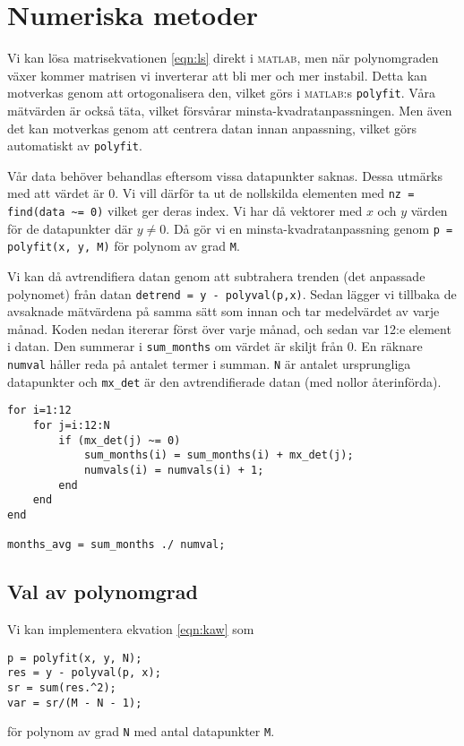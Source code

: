 \section{Numeriska metoder}
\label{sec:metoder}

Vi kan lösa matrisekvationen \ref{eqn:ls} direkt i \textsc{matlab}, men när polynomgraden växer kommer matrisen vi inverterar att bli mer och mer instabil. Detta kan motverkas genom att ortogonalisera den, vilket görs i \textsc{matlab}:s \lstinline|polyfit|. Våra mätvärden är också täta, vilket försvårar minsta-kvadratanpassningen. Men även det kan motverkas genom att centrera datan innan anpassning, vilket görs automatiskt av \lstinline|polyfit|.

Vår data behöver behandlas eftersom vissa datapunkter saknas. Dessa utmärks med att värdet är 0. Vi vill därför ta ut de nollskilda elementen med \lstinline|nz = find(data ~= 0)| vilket ger deras index. Vi har då vektorer med $x$ och $y$ värden för de datapunkter där $ y \neq 0$. Då gör vi en minsta-kvadratanpassning genom \lstinline|p = polyfit(x, y, M)| för polynom av grad \lstinline|M|.

Vi kan då avtrendifiera datan genom att subtrahera trenden (det anpassade polynomet) från datan \lstinline|detrend = y - polyval(p,x)|. Sedan lägger vi tillbaka de avsaknade mätvärdena på samma sätt som innan och tar medelvärdet av varje månad. Koden nedan itererar först över varje månad, och sedan var 12:e element i datan. Den summerar i \lstinline|sum_months| om värdet är skiljt från 0. En räknare \lstinline|numval| håller reda på antalet termer i summan. \lstinline|N| är antalet ursprungliga datapunkter och \lstinline|mx_det| är den avtrendifierade datan (med nollor återinförda). 
\begin{lstlisting}
for i=1:12
    for j=i:12:N
        if (mx_det(j) ~= 0)
            sum_months(i) = sum_months(i) + mx_det(j);
            numvals(i) = numvals(i) + 1;
        end
    end
end

months_avg = sum_months ./ numval;
\end{lstlisting}

\subsection{Val av polynomgrad}

Vi kan implementera ekvation \ref{eqn:kaw} som 
\begin{lstlisting}
p = polyfit(x, y, N);
res = y - polyval(p, x);
sr = sum(res.^2);
var = sr/(M - N - 1);
\end{lstlisting}
för polynom av grad \lstinline|N| med antal datapunkter \lstinline|M|.
